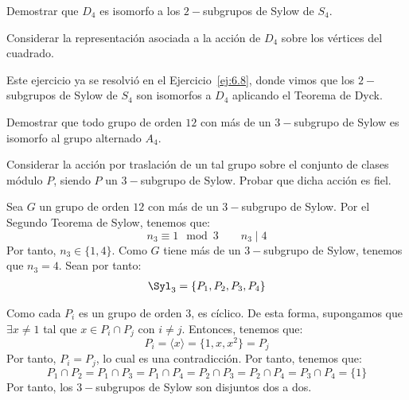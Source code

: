 \begin{ejercicio}\label{ej:6.22}
    Demostrar que $D_4$ es isomorfo a los $2-$subgrupos de Sylow de $S_4$.
    \begin{observacion}
        Considerar la representación asociada a la acción de $D_4$ sobre los vértices del cuadrado.
    \end{observacion}
    
    
    Este ejercicio ya se resolvió en el Ejercicio~\ref{ej:6.8}, donde vimos que los $2-$subgrupos de Sylow de $S_4$ son isomorfos a $D_4$ aplicando el Teorema de Dyck.
\end{ejercicio}

\begin{ejercicio}\label{ej:6.23}
    Demostrar que todo grupo de orden $12$ con más de un $3-$subgrupo de Sylow es isomorfo al grupo alternado $A_4$.
    \begin{observacion}
        Considerar la acción por traslación de un tal grupo sobre el conjunto de clases módulo $P$, siendo $P$ un $3-$subgrupo de Sylow. Probar que dicha acción es fiel.
    \end{observacion}
    
    Sea $G$ un grupo de orden $12$ con más de un $3-$subgrupo de Sylow. Por el Segundo Teorema de Sylow, tenemos que:
    \begin{equation*}
        n_3 \equiv 1 \mod 3 \qquad n_3 \mid 4
    \end{equation*}
    Por tanto, $n_3\in \{1,4\}$. Como $G$ tiene más de un $3-$subgrupo de Sylow, tenemos que $n_3=4$. Sean por tanto:
    \begin{align*}
        \Syl_3 = \{P_1,P_2,P_3,P_4\}
    \end{align*}

    Como cada $P_i$ es un grupo de orden $3$, es cíclico. De esta forma, supongamos que $\exists x\neq 1$ tal que $x\in P_i\cap P_j$ con $i\neq j$. Entonces, tenemos que:
    \begin{equation*}
        P_i = \langle x \rangle = \{1,x,x^2\} = P_j
    \end{equation*}
    Por tanto, $P_i=P_j$, lo cual es una contradicción. Por tanto, tenemos que:
    \begin{equation*}
        P_1\cap P_2 = P_1\cap P_3 = P_1\cap P_4 = P_2\cap P_3 = P_2\cap P_4 = P_3\cap P_4 = \{1\}
    \end{equation*}
    Por tanto, los $3-$subgrupos de Sylow son disjuntos dos a dos.\\


\end{ejercicio}
